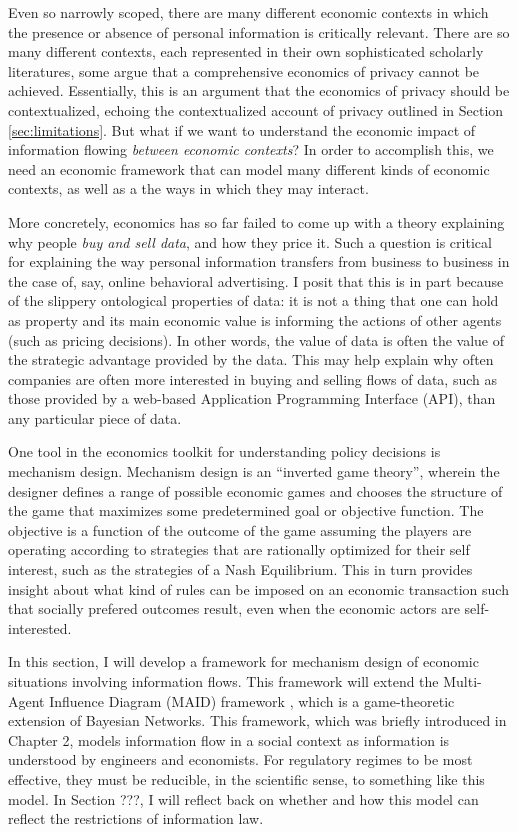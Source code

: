 \documentclass[../thesis.tex]{subfiles}
\begin{document}
Even so narrowly scoped, there are many different
economic contexts in which the presence or absence 
of personal information is critically relevant. 
There are so many different contexts, each represented
in their own sophisticated scholarly literatures,
some \cite{acquisti2016economics} argue that a comprehensive
economics of privacy cannot be achieved.
Essentially, this is an argument that the economics
of privacy should be contextualized, echoing
the contextualized account of privacy outlined
in Section \ref{sec:limitations}.
But what if we want to understand the economic impact of
information flowing \emph{between economic contexts}?
In order to accomplish this, we need an economic framework
that can model many different kinds of economic contexts,
as well as a the ways in which they may interact.

More concretely, economics has so far failed to come up
with a theory explaining why people \emph{buy and sell data},
and how they price it.
Such a question is critical for explaining the way personal
information transfers from business to business in the case
of, say, online behavioral advertising.
I posit that this is in part because of the slippery
ontological properties of data: it is not a thing that
one can hold as property and its main economic value is
informing the actions of other agents (such as pricing
decisions).
In other words, the value of data is often the value
of the strategic advantage provided by the data.
This may help explain why often companies are often
more interested in buying and selling
flows of data, such as those provided by a web-based
Application Programming Interface (API), than any particular
piece of data.

One tool in the economics toolkit for understanding
policy decisions is mechanism design. \cite{hurwicz2006designing}
\cite{nisan2007introduction}
Mechanism design is an ``inverted game theory'',
wherein the designer defines a range of possible
economic games and chooses the structure of the game
that maximizes some predetermined goal or objective
function.
The objective is a function of the outcome of the
game assuming the players are operating according
to strategies that are rationally optimized for their
self interest, such as the strategies of a Nash Equilibrium.
This in turn provides insight about what kind of rules
can be imposed on an economic transaction such that socially
prefered outcomes result, even when the economic actors
are self-interested.

In this section, I will develop a framework for mechanism
design of economic situations involving information flows.
This framework will extend the Multi-Agent Influence Diagram
(MAID) framework \cite{koller2003multi}, which is a
game-theoretic extension of Bayesian Networks.
This framework, which was briefly introduced in Chapter 2,
models information flow in a social context as information
is understood by engineers and economists.
For regulatory regimes to be most effective, they must
be reducible, in the scientific sense, to something like
this model. In Section ???, I will reflect back on whether
and how this model can reflect the restrictions of information
law.
\end{document}
